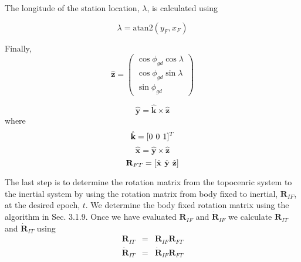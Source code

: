 {The longitude  of the station location, $\lambda$,  is calculated
using

\begin{equation}
    \lambda = \mbox{atan2}(y_F,x_F)
\end{equation}

%
Finally,
%
\begin{equation}
     \hat{\mathbf{z}} = \left(
     \begin{array}{cc}
          \cos{\phi_{gd}}\cos{\lambda}\\
          \cos{\phi_{gd}}\sin{\lambda}\\
          \sin{\phi_{gd}}
     \end{array}
     \right) \label{Eq:GeodeLatToz}
\end{equation}

\begin{equation}
     \hat{\mathbf{y}} = \hat{\mathbf{k}}
     \times \hat{\mathbf{z}}
\end{equation}
%
where
%
\begin{equation}
     \hat{\mathbf{k}} = [0 \hspace{.05 in} 0 \hspace{.05 in} 1]^T
\end{equation}
%
\begin{equation}
     \hat{\mathbf{x}} = \hat{\mathbf{y}}
     \times \hat{\mathbf{z}}
\end{equation}
%
\begin{equation}
     \mathbf{R}_{FT} = [\hat{\mathbf{x}} \hspace{.05 in} \hat{\mathbf{y}}\hspace{.05 in} \hat{\mathbf{z}}]
\end{equation}

The last step is to determine the rotation matrix from the
topocenric system to the inertial system by using the rotation
matrix from body fixed to inertial, $\mathbf{R}_{IF}$, at the
desired epoch, $t$.  We determine the body fixed rotation matrix
using the algorithm in Sec. 3.1.9.  Once we have evaluated
$\mathbf{R}_{IF}$ and $\dot{\mathbf{R}}_{IF}$ we calculate
$\mathbf{R}_{IT}$ and $\dot{\mathbf{R}}_{IT}$ using
%
\begin{eqnarray}
      \mathbf{R}_{IT} &=& \mathbf{R}_{IF}
      \mathbf{R}_{FT}\\
%
      \dot{\mathbf{R}}_{IT} &=& \dot{\mathbf{R}}_{IF}
      \mathbf{R}_{FT}\label{Eq:TopoRdot}
\end{eqnarray}



}
